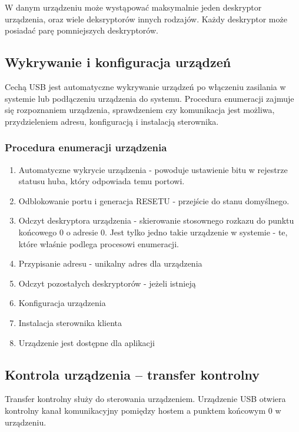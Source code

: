 	W danym urządzeniu może wystąpować maksymalnie jeden deskryptor urządzenia, oraz wiele deksryptorów innych rodzajów. Każdy deskryptor może posiadać parę pomniejszych deskryptorów.
	
\subsection{Wykrywanie i konfiguracja urządzeń}
	Cechą USB jest automatyczne wykrywanie urządzeń po włączeniu zasilania w systemie lub podłączeniu urządzenia do systemu. Procedura enumeracji zajmuje się rozpoznaniem urządzenia, sprawdzeniem czy komunikacja jest możliwa, przydzieleniem adresu, konfiguracją i instalacją sterownika.
	\subsubsection{Procedura enumeracji urządzenia}
	\begin{enumerate}
		\item Automatyczne wykrycie urządzenia - powoduje ustawienie bitu w rejestrze statusu huba, który odpowiada temu portowi.
		\item Odblokowanie portu i generacja RESETU - przejście do stanu domyślnego.
		\item Odczyt deskryptora urządzenia - skierowanie stosownego rozkazu do punktu końcowego 0 o adresie 0. Jest tylko jedno takie urządzenie w systemie - te, które właśnie podlega procesowi enumeracji.
		\item Przypisanie adresu - unikalny adres dla urządzenia
		\item Odczyt pozostałych deskryptorów - jeżeli istnieją
		\item Konfiguracja urządzenia
		\item Instalacja sterownika klienta
		\item Urządzenie jest dostępne dla aplikacji
	\end{enumerate}
	
\subsection{Kontrola urządzenia – transfer kontrolny}
	Transfer kontrolny służy do sterowania urządzeniem. Urządzenie USB otwiera kontrolny kanał komunikacyjny pomiędzy hostem a punktem końcowym 0 w urządzeniu.
